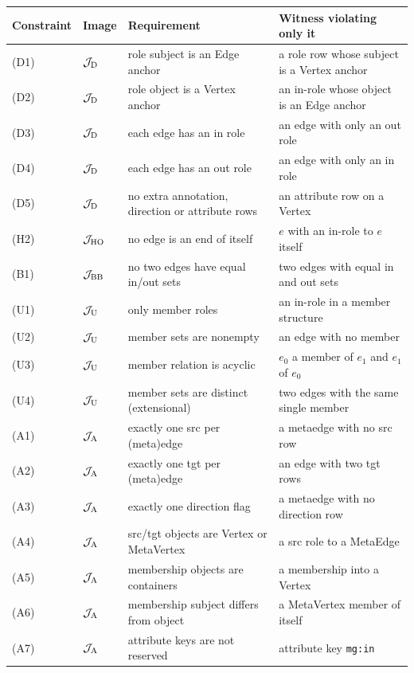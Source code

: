 \begin{tabular}{llL{4.6cm}L{5.2cm}}
\toprule
Constraint & Image & Requirement & Witness violating only it \\
\midrule
(D1) & $\mathcal J_{\mathrm{D}}$ & role subject is an Edge anchor & a role row whose subject is a Vertex anchor \\
(D2) & $\mathcal J_{\mathrm{D}}$ & role object is a Vertex anchor & an in-role whose object is an Edge anchor \\
(D3) & $\mathcal J_{\mathrm{D}}$ & each edge has an in role & an edge with only an out role \\
(D4) & $\mathcal J_{\mathrm{D}}$ & each edge has an out role & an edge with only an in role \\
(D5) & $\mathcal J_{\mathrm{D}}$ & no extra annotation, direction or attribute rows & an attribute row on a Vertex \\
(H2) & $\mathcal J_{\mathrm{HO}}$ & no edge is an end of itself & $e$ with an in-role to $e$ itself \\
(B1) & $\mathcal J_{\mathrm{BB}}$ & no two edges have equal in/out sets & two edges with equal in and out sets \\
(U1) & $\mathcal J_{\mathrm{U}}$ & only member roles & an in-role in a member structure \\
(U2) & $\mathcal J_{\mathrm{U}}$ & member sets are nonempty & an edge with no member \\
(U3) & $\mathcal J_{\mathrm{U}}$ & member relation is acyclic & $e_0$ a member of $e_1$ and $e_1$ of $e_0$ \\
(U4) & $\mathcal J_{\mathrm{U}}$ & member sets are distinct (extensional) & two edges with the same single member \\
(A1) & $\mathcal J_{\mathrm{A}}$ & exactly one src per (meta)edge & a metaedge with no src row \\
(A2) & $\mathcal J_{\mathrm{A}}$ & exactly one tgt per (meta)edge & an edge with two tgt rows \\
(A3) & $\mathcal J_{\mathrm{A}}$ & exactly one direction flag & a metaedge with no direction row \\
(A4) & $\mathcal J_{\mathrm{A}}$ & src/tgt objects are Vertex or MetaVertex & a src role to a MetaEdge \\
(A5) & $\mathcal J_{\mathrm{A}}$ & membership objects are containers & a membership into a Vertex \\
(A6) & $\mathcal J_{\mathrm{A}}$ & membership subject differs from object & a MetaVertex member of itself \\
(A7) & $\mathcal J_{\mathrm{A}}$ & attribute keys are not reserved & attribute key \texttt{mg:in} \\
\bottomrule
\end{tabular}
